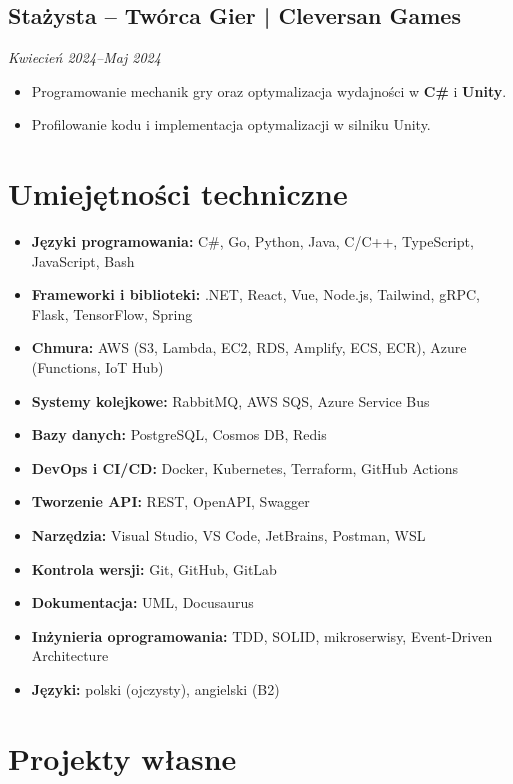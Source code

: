 \documentclass[a4paper,10pt]{article}
\begin{document}
\subsection{Stażysta – Twórca Gier | Cleversan Games}
\textit{Kwiecień 2024--Maj 2024}
\begin{itemize}[leftmargin=0.5cm, nosep]
    \item Programowanie mechanik gry oraz optymalizacja wydajności w \textbf{C\#} i \textbf{Unity}.
    \item Profilowanie kodu i implementacja optymalizacji w silniku Unity.
\end{itemize}

\section{Umiejętności techniczne}

\begin{itemize}[leftmargin=0.5cm, itemsep=6pt, label=\textbullet]
    \item \textbf{Języki programowania:} C\#, Go, Python, Java, C/C++, TypeScript, JavaScript, Bash
    \item \textbf{Frameworki i biblioteki:} .NET, React, Vue, Node.js, Tailwind, gRPC, Flask, TensorFlow, Spring
    \item \textbf{Chmura:} AWS (S3, Lambda, EC2, RDS, Amplify, ECS, ECR), Azure (Functions, IoT Hub)
    \item \textbf{Systemy kolejkowe:} RabbitMQ, AWS SQS, Azure Service Bus
    \item \textbf{Bazy danych:} PostgreSQL, Cosmos DB, Redis
    \item \textbf{DevOps i CI/CD:} Docker, Kubernetes, Terraform, GitHub Actions
    \item \textbf{Tworzenie API:} REST, OpenAPI, Swagger
    \item \textbf{Narzędzia:} Visual Studio, VS Code, JetBrains, Postman, WSL
    \item \textbf{Kontrola wersji:} Git, GitHub, GitLab
    \item \textbf{Dokumentacja:} UML, Docusaurus
    \item \textbf{Inżynieria oprogramowania:} TDD, SOLID, mikroserwisy, Event-Driven Architecture
    \item \textbf{Języki:} polski (ojczysty), angielski (B2)
\end{itemize}

\section{Projekty własne}
\end{document}
